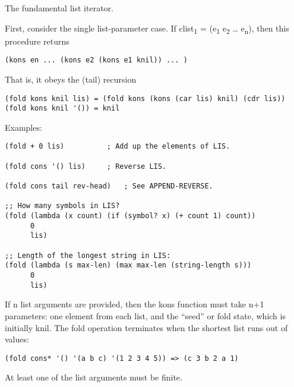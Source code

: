 \begin{entry}{%
  }

  The
  fundamental list iterator.

  First, consider the single list-parameter case. If
  clist\textsubscript{1} = (e\textsubscript{1} e\textsubscript{2}
  \ldots{} e\textsubscript{n}), then this procedure returns

  \texttt{(kons\ en\ ...\ (kons\ e2\ (kons\ e1\ knil))\ ...\ )}

  That is, it obeys the (tail) recursion

\begin{verbatim}
(fold kons knil lis) = (fold kons (kons (car lis) knil) (cdr lis))
(fold kons knil '()) = knil
\end{verbatim}

  Examples:

\begin{verbatim}
(fold + 0 lis)          ; Add up the elements of LIS.

(fold cons '() lis)     ; Reverse LIS.

(fold cons tail rev-head)   ; See APPEND-REVERSE.

;; How many symbols in LIS?
(fold (lambda (x count) (if (symbol? x) (+ count 1) count))
      0
      lis)

;; Length of the longest string in LIS:
(fold (lambda (s max-len) (max max-len (string-length s)))
      0
      lis)
\end{verbatim}

  If n list arguments are provided, then the kons function must take
  n+1 parameters: one element from each list, and the ``seed'' or fold
  state, which is initially knil. The fold operation terminates when
  the shortest list runs out of values:

\begin{verbatim}
(fold cons* '() '(a b c) '(1 2 3 4 5)) => (c 3 b 2 a 1)
\end{verbatim}

  At least one of the list arguments must be finite.
\end{entry}

